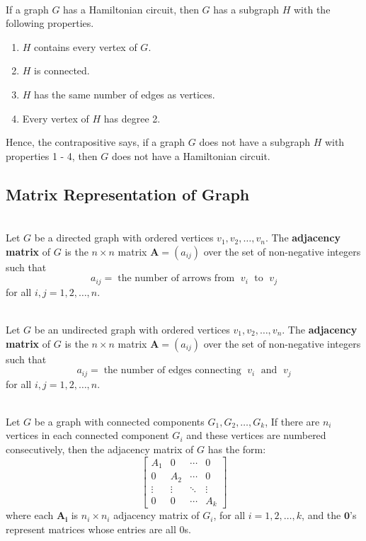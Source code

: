 \documentclass[12pt]{article}
\begin{document}
\begin{proposition}[10.2.6]
\hfill\\
\normalfont If a graph $G$ has a Hamiltonian circuit, then $G$ has a subgraph $H$ with the following properties.
\begin{enumerate}
\item $H$ contains every vertex of $G$.
\item $H$ is connected.
\item $H$ has the same number of edges as vertices.
\item Every vertex of $H$ has degree 2.
\end{enumerate}
Hence, the contrapositive says, if a graph $G$ does not have a subgraph $H$ with properties 1 - 4, then $G$ does not have a Hamiltonian circuit.
\end{proposition}
\subsection{Matrix Representation of Graph}
\begin{definition}
\hfill\\
\normalfont Let $G$ be a directed graph with ordered vertices $v_1,v_2,\ldots,v_n$. The \textbf{adjacency matrix} of $G$ is the $n\times n$ matrix $\textbf{A}=(a_{ij})$ over the set of non-negative integers such that
\[
a_{ij} =\;\text{the number of arrows from }\;v_i\;\text{ to }\;v_j
\]
for all $i,j = 1,2,\ldots,n$.
\end{definition}
\begin{definition}
\hfill\\
\normalfont Let $G$ be an undirected graph with ordered vertices $v_1,v_2,\ldots,v_n$. The \textbf{adjacency matrix} of $G$ is the $n\times n$ matrix $\textbf{A}=(a_{ij})$ over the set of non-negative integers such that
\[
a_{ij} =\;\text{the number of edges connecting }\;v_i\;\text{ and }\;v_j
\]
for all $i,j = 1,2,\ldots,n$.
\end{definition}
\begin{theorem}[10.3.1]
\hfill\\
\normalfont Let $G$ be a graph with connected components $G_1,G_2,\ldots,G_k$, If there are $n_i$ vertices in each connected component $G_i$ and these vertices are numbered consecutively, then the adjacency matrix of $G$ has the form:
\begingroup \boldmath
\[
\begin{bmatrix}
A_1&0&\cdots&0\\
0&A_2&\cdots&0\\
\vdots&\vdots&\ddots&\vdots\\
0&0&\cdots&A_k
\end{bmatrix}
\]
\endgroup
where each $\bm{A_i}$ is $n_i\times n_i$ adjacency matrix of $G_i$, for all $i = 1,2,\ldots, k$, and the $\bm{0}$'s represent matrices whose entries are all 0s.
\end{theorem}
\end{document}
